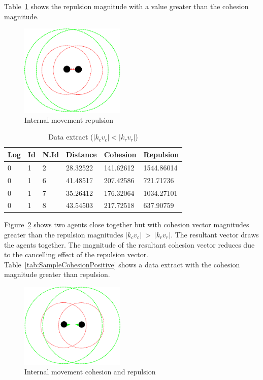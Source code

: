 \documentclass{ieeeaccess}
\begin{document}
Table~\ref{tab:SampleReplusionPositive} shows the repulsion magnitude with a value greater than the cohesion magnitude.

\begin{figure}[H]
\begin{center}
\includegraphics[width=5cm]{figures/Stability2}
\end{center}
\caption{Internal movement repulsion} \label{methods:Stability2}
\end{figure}

\begin{table}[H]
\begin{center}
\begin{tabular}{| l | l | l | l | l | l |}
\hline
Log &	Id &	N.Id &	Distance &	{\color{green}Cohesion} &	{\color{red}Repulsion} 	\\ \hline
0 & 1 & 2 & 28.32522 & {\color{green}141.62612} & {\color{red}1544.86014} \\ \hline
0 & 1 & 6 & 41.48517 & {\color{green}207.42586} & {\color{red}721.71736} \\ \hline
0 & 1 & 7 & 35.26412 & {\color{green}176.32064} & {\color{red}1034.27101} \\ \hline
0 & 1 & 8 & 43.54503 & {\color{green}217.72518} & {\color{red}637.90759} \\
\hline
\end{tabular}\caption{Data extract ($|k_cv_c| < |k_rv_r|$)} \label{tab:SampleReplusionPositive}
\end{center}
\end{table}

Figure~\ref{methods:Stability3} shows two agents close together but with cohesion vector magnitudes greater than the repulsion magnitudes $|k_cv_c|~>~|k_rv_r|$. The resultant vector draws the agents together. The magnitude of the resultant cohesion vector reduces due to the cancelling effect of the repulsion vector. Table~\ref{tab:SampleCohesionPositive} shows a data extract with the cohesion magnitude greater than repulsion.

\begin{figure}[H]
\begin{center}
\includegraphics[width=5cm]{figures/Stability3}
\end{center}
\caption{Internal movement cohesion and repulsion} \label{methods:Stability3}
\end{figure}
\end{document}
